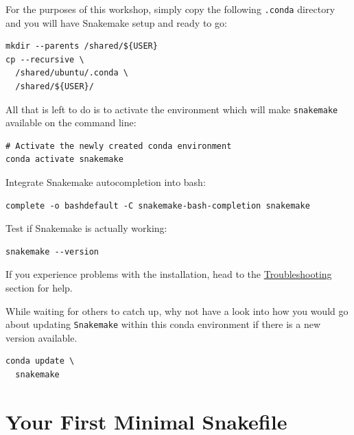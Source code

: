\begin{steps}

For the purposes of this workshop, simply copy the following \texttt{.conda} directory and you
will have Snakemake setup and ready to go:

\begin{lstlisting}
mkdir --parents /shared/${USER}
cp --recursive \
  /shared/ubuntu/.conda \
  /shared/${USER}/
\end{lstlisting}

All that is left to do is to activate the environment which will make \texttt{snakemake} available on the command line:

\begin{lstlisting}
# Activate the newly created conda environment
conda activate snakemake
\end{lstlisting}

Integrate Snakemake autocompletion into bash:

\begin{lstlisting}
complete -o bashdefault -C snakemake-bash-completion snakemake
\end{lstlisting}

Test if Snakemake is actually working:

\begin{lstlisting}
snakemake --version
\end{lstlisting}

\end{steps}

If you experience problems with the installation, head to the \hyperref[sec:snake_trouble]{Troubleshooting} section for help.

\begin{bonus}

While waiting for others to catch up, why not have a look into how you would go about updating \texttt{Snakemake}
within this conda environment if there is a new version available.

\begin{answer}
\begin{lstlisting}
conda update \
  snakemake
\end{lstlisting}
\end{answer}

\end{bonus}


\section{Your First Minimal Snakefile}

